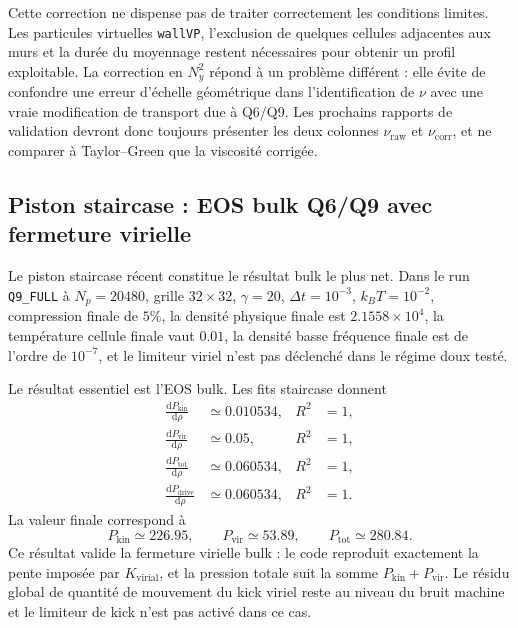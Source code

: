\documentclass[11pt,a4paper]{article}
\begin{document}
Cette correction ne dispense pas de traiter correctement les conditions limites. Les particules virtuelles \texttt{wallVP}, l'exclusion de quelques cellules adjacentes aux murs et la durée du moyennage restent nécessaires pour obtenir un profil exploitable. La correction en \(N_y^2\) répond à un problème différent : elle évite de confondre une erreur d'échelle géométrique dans l'identification de \(\nu\) avec une vraie modification de transport due à Q6/Q9. Les prochains rapports de validation devront donc toujours présenter les deux colonnes \(\nu_{\mathrm{raw}}\) et \(\nu_{\mathrm{corr}}\), et ne comparer à Taylor--Green que la viscosité corrigée.

\subsection{Piston staircase : EOS bulk Q6/Q9 avec fermeture virielle}

Le piston staircase récent constitue le résultat bulk le plus net. Dans le run \texttt{Q9\_FULL} à \(N_p=20480\), grille \(32\times32\), \(\gamma=20\), \(\Delta t=10^{-3}\), \(k_BT=10^{-2}\), compression finale de \(5\%\), la densité physique finale est \(2.1558\times10^4\), la température cellule finale vaut \(0.01\), la densité basse fréquence finale est de l'ordre de \(10^{-7}\), et le limiteur viriel n'est pas déclenché dans le régime doux testé.

Le résultat essentiel est l'EOS bulk. Les fits staircase donnent
\begin{align}
  \frac{\mathrm d P_{\mathrm{kin}}}{\mathrm d\rho} &\simeq 0.010534, & R^2&=1,\\
  \frac{\mathrm d P_{\mathrm{vir}}}{\mathrm d\rho} &\simeq 0.05, & R^2&=1,\\
  \frac{\mathrm d P_{\mathrm{tot}}}{\mathrm d\rho} &\simeq 0.060534, & R^2&=1,\\
  \frac{\mathrm d P_{\mathrm{drive}}}{\mathrm d\rho} &\simeq 0.060534, & R^2&=1.
\end{align}
La valeur finale correspond à
\begin{equation}
  P_{\mathrm{kin}}\simeq 226.95,
  \qquad
  P_{\mathrm{vir}}\simeq 53.89,
  \qquad
  P_{\mathrm{tot}}\simeq 280.84.
\end{equation}
Ce résultat valide la fermeture virielle bulk : le code reproduit exactement la pente imposée par \(K_{\mathrm{virial}}\), et la pression totale suit la somme \(P_{\mathrm{kin}}+P_{\mathrm{vir}}\). Le résidu global de quantité de mouvement du kick viriel reste au niveau du bruit machine et le limiteur de kick n'est pas activé dans ce cas.
\end{document}
